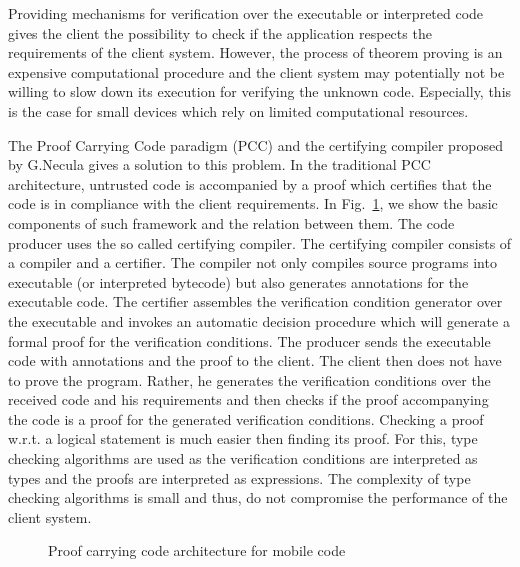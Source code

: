 Providing mechanisms for verification over the executable or interpreted code gives the client the possibility to check if the application respects the requirements of the client system.
However, the process of theorem proving is an expensive computational procedure and  the client system may potentially not be willing to 
slow down its execution for verifying the unknown code.
Especially, this is the case for small devices which rely on limited computational resources. 

 The Proof Carrying Code paradigm (PCC) and the certifying compiler proposed by G.Necula \cite{DesNecLee98} gives a solution to this problem. In the traditional PCC architecture, untrusted code is accompanied by a proof which certifies that the code is in compliance with the client  requirements. In Fig.\ \ref{intro:PCC}, we show  the basic components of such framework and the relation between them. The code producer uses the so called certifying compiler. The certifying compiler consists of a compiler and a certifier. 
The compiler not only compiles source programs
into executable (or interpreted bytecode) but also generates annotations for the executable code.
 The certifier assembles the verification condition generator over the executable and invokes an automatic decision procedure which will 
generate a formal proof for the verification conditions. The producer sends the 
executable code with annotations  and the proof to the client.
The client then does not have to prove the program. Rather, he generates the verification conditions over the received code  and his requirements and
then checks if  the proof accompanying the code is a proof for the generated verification conditions. Checking a proof w.r.t. a logical statement is much easier then finding  
its proof.  For this, type checking algorithms are used as  the verification conditions are interpreted as types and the proofs are interpreted as expressions. 
The complexity of type checking algorithms is small and thus, do not compromise  the performance of the client system.
\begin{figure}[ht!]
\begin{center}
\caption{\sc Proof carrying code architecture for mobile code}
\label{intro:PCC}
\end{center}
\end{figure}



